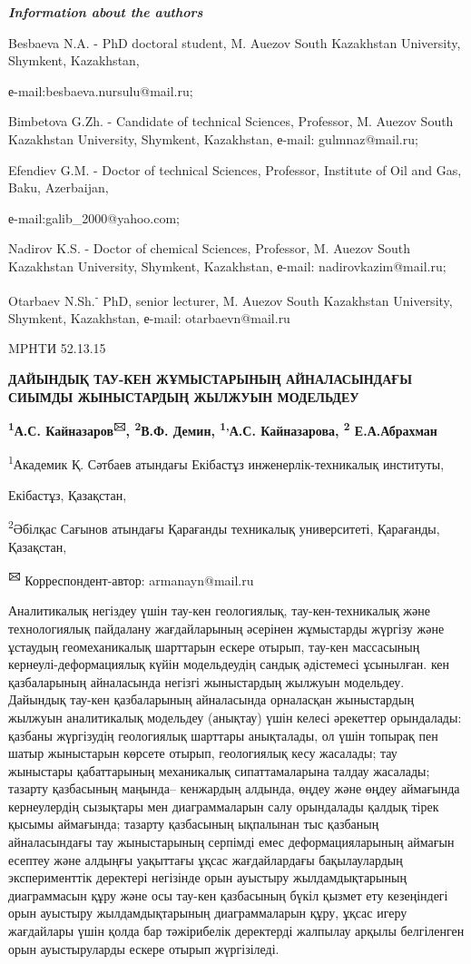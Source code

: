 \emph{{\bfseries Information about the authors}}

Besbaeva N.A. - PhD doctoral student, M. Auezov South Kazakhstan
University, Shymkent, Kazakhstan,

е-mail:besbaeva.nursulu@mail.ru;

Bimbetova G.Zh. - Candidate of technical Sciences, Professor, M. Auezov
South Kazakhstan University, Shymkent, Kazakhstan, е-mail:
gulmnaz@mail.ru;

Efendiev G.M. - Doctor of technical Sciences, Professor, Institute of
Oil and Gas, Baku, Azerbaijan,

е-mail:galib\_2000@yahoo.com;

Nadirov K.S. - Doctor of chemical Sciences, Professor, M. Auezov South
Kazakhstan University, Shymkent, Kazakhstan, е-mail:
nadirovkazim@mail.ru;

Otarbaev N.Sh.\textsuperscript{-} PhD, senior lecturer, M. Auezov South
Kazakhstan University, Shymkent, Kazakhstan, е-mail: otarbaevn@mail.ru

\emph{{\bfseries \hfill\break
}}MPHTИ 52.13.15

{\bfseries ДАЙЫНДЫҚ ТАУ-КЕН ЖҰМЫСТАРЫНЫҢ АЙНАЛАСЫНДАҒЫ СИЫМДЫ ЖЫНЫСТАРДЫҢ
ЖЫЛЖУЫН МОДЕЛЬДЕУ}

{\bfseries \textsuperscript{1}А.С. Кайназаров\textsuperscript{🖂},
\textsuperscript{2}В.Ф. Демин, \textsuperscript{1,}А.С. Кайназарова,
\textsuperscript{2} Е.А.Абрахман}

\textsuperscript{1}Академик Қ. Сәтбаев атындағы Екібастұз
инженерлік-техникалық институты,

Екібастұз, Қазақстан,

\textsuperscript{2}Әбілқас Сағынов атындағы Қарағанды техникалық
университеті, Қарағанды, Қазақстан,

{\bfseries \textsuperscript{🖂}} Корреспондент-автор: armanayn@mail.ru

Аналитикалық негіздеу үшін тау-кен геологиялық, тау-кен-техникалық және
технологиялық пайдалану жағдайларының әсерінен жұмыстарды жүргізу және
ұстаудың геомеханикалық шарттарын ескере отырып, тау-кен массасының
кернеулі-деформациялық күйін модельдеудің сандық әдістемесі ұсынылған.
кен қазбаларының айналасында негізгі жыныстардың жылжуын модельдеу.
Дайындық тау-кен қазбаларының айналасында орналасқан жыныстардың жылжуын
аналитикалық модельдеу (анықтау) үшін келесі әрекеттер орындалады:
қазбаны жүргізудің геологиялық шарттары анықталады, ол үшін топырақ пен
шатыр жыныстарын көрсете отырып, геологиялық кесу жасалады; тау
жыныстары қабаттарының механикалық сипаттамаларына талдау жасалады;
тазарту қазбасының маңында-- кенжардың алдында, өңдеу және өңдеу
аймағында кернеулердің сызықтары мен диаграммаларын салу орындалады
қалдық тірек қысымы аймағында; тазарту қазбасының ықпалынан тыс қазбаның
айналасындағы тау жыныстарының серпімді емес деформацияларының аймағын
есептеу және алдыңғы уақыттағы ұқсас жағдайлардағы бақылаулардың
эксперименттік деректері негізінде орын ауыстыру жылдамдықтарының
диаграммасын құру және осы тау-кен қазбасының бүкіл қызмет ету
кезеңіндегі орын ауыстыру жылдамдықтарының диаграммаларын құру, ұқсас
игеру жағдайлары үшін қолда бар тәжірибелік деректерді жалпылау арқылы
белгіленген орын ауыстыруларды ескере отырып жүргізіледі.

